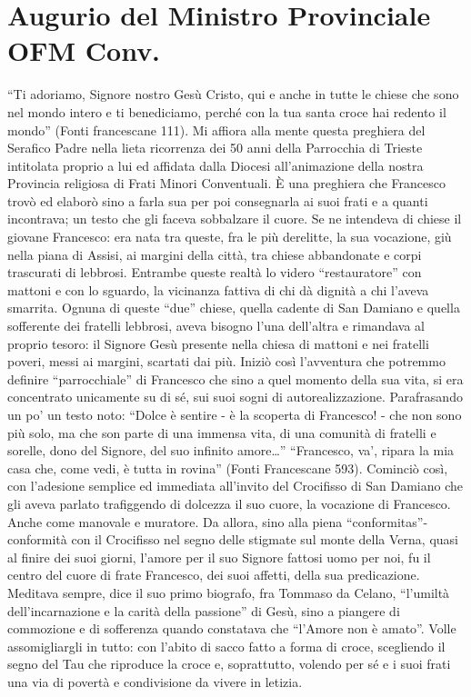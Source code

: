 \chapter*{Augurio del Ministro Provinciale OFM Conv.}
``Ti adoriamo, Signore nostro Gesù Cristo, qui e anche in tutte le chiese che sono nel mondo 
intero e ti benediciamo, perché con la tua santa croce hai redento il mondo” (Fonti francescane 
111). Mi affiora alla mente questa preghiera del Serafico Padre nella lieta ricorrenza dei 50 anni 
della Parrocchia di Trieste intitolata proprio a lui ed affidata dalla Diocesi all’animazione della 
nostra Provincia religiosa di Frati Minori Conventuali. È una preghiera che Francesco trovò ed 
elaborò sino a farla sua per poi consegnarla ai suoi frati e a quanti incontrava; un testo che gli 
faceva sobbalzare il cuore. Se ne intendeva di chiese il giovane Francesco: era nata tra queste, fra le 
più derelitte, la sua vocazione, giù nella piana di Assisi, ai margini della città, tra chiese 
abbandonate e corpi trascurati di lebbrosi. Entrambe queste realtà lo videro “restauratore” con 
mattoni e con lo sguardo, la vicinanza fattiva di chi dà dignità a chi l’aveva smarrita. Ognuna di 
queste “due” chiese, quella cadente di San Damiano e quella sofferente dei fratelli lebbrosi, aveva 
bisogno l’una dell’altra e rimandava al proprio tesoro: il Signore Gesù presente nella chiesa di 
mattoni e nei fratelli poveri, messi ai margini, scartati dai più. Iniziò così l’avventura che potremmo 
definire ``parrocchiale'' di Francesco che sino a quel momento della sua vita, si era concentrato 
unicamente su di sé, sui suoi sogni di autorealizzazione. Parafrasando un po' un testo noto: ``Dolce è 
sentire - è la scoperta di Francesco! - che non sono più solo, ma che son parte di una immensa vita, 
di una comunità di fratelli e sorelle, dono del Signore, del suo infinito amore…''
\bigbreak
``Francesco, va’, ripara la mia casa che, come vedi, è tutta in rovina'' (Fonti Francescane 
593). Cominciò così, con l’adesione semplice ed immediata all’invito del Crocifisso di San 
Damiano che gli aveva parlato trafiggendo di dolcezza il suo cuore, la vocazione di Francesco. 
Anche come manovale e muratore. Da allora, sino alla piena “conformitas”- conformità con il 
Crocifisso nel segno delle stigmate sul monte della Verna, quasi al finire dei suoi giorni, l’amore 
per il suo Signore fattosi uomo per noi, fu il centro del cuore di frate Francesco, dei suoi affetti, 
della sua predicazione. Meditava sempre, dice il suo primo biografo, fra Tommaso da Celano, 
“l’umiltà dell’incarnazione e la carità della passione” di Gesù, sino a piangere di commozione e di 
sofferenza quando constatava che “l’Amore non è amato”. Volle assomigliargli in tutto: con l’abito 
di sacco fatto a forma di croce, scegliendo il segno del Tau che riproduce la croce e, soprattutto, 
volendo per sé e i suoi frati una via di povertà e condivisione da vivere in letizia.

